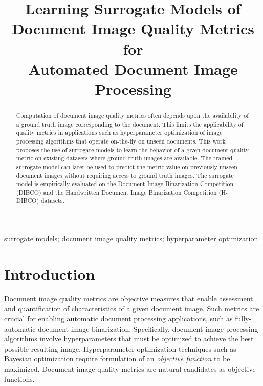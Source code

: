 \documentclass[10pt, a4paper, conference, compsocconf]{IEEEtran}
\begin{document}
\title{Learning Surrogate Models of Document Image Quality Metrics for \\Automated Document Image Processing}

\author{
}







\maketitle

\begin{abstract}
Computation of document image quality metrics often depends upon the availability of a ground truth image corresponding to the document. This limits the applicability of quality metrics in applications such as hyperparameter optimization of image processing algorithms that operate on-the-fly on unseen documents. This work proposes the use of surrogate models to learn the behavior of a given document quality metric on existing datasets where ground truth images are available. The trained surrogate model can later be used to predict the metric value on previously unseen document images without requiring access to ground truth images. The surrogate model is empirically evaluated on the Document Image Binarization Competition (DIBCO) and the Handwritten Document Image Binarization Competition (H-DIBCO) datasets.

\end{abstract}

\begin{IEEEkeywords}
surrogate models; document image quality metrics; hyperparameter optimization

\end{IEEEkeywords}


\IEEEpeerreviewmaketitle



\section{Introduction}
\label{sec:intro}

Document image quality metrics are objective measures that enable assessment and quantification of characteristics of a given document image. Such metrics are crucial for enabling automatic document processing applications, such as fully-automatic document image binarization. Specifically, document image processing algorithms involve hyperparameters that must be optimized to achieve the best possible resulting image. Hyperparameter optimization techniques such as Bayesian optimization \cite{snoek2012practical} require formulation of an \emph{objective function} to be maximized. Document image quality metrics are natural candidates as objective functions. 
\end{document}
